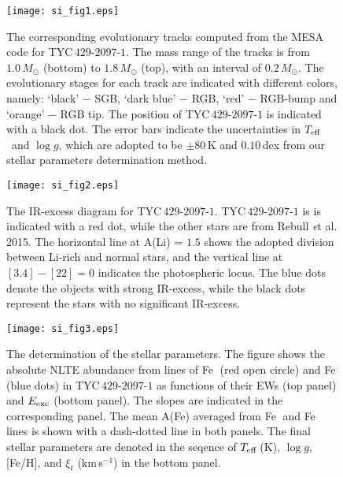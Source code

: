 \documentclass[twoside,onecolumnm,12pt]{article}
\newcommand{\upcite}[1]{\textsuperscript{\textsuperscript{\cite{#1}}}}
\newcommand{\Teff}{$T_{\rm eff}$}
\newcommand\ion[2]{#1$\;${\scriptsize\rmfamily\uppercase\expandafter{\romannumeral#2}}\relax}
\begin{document}
\begin{figure}[!h]
\setlength{\abovecaptionskip}{-15pt}
\setlength{\belowcaptionskip}{-15pt}
\texttt{[image: si\_fig1.eps]}\\
\caption{The corresponding evolutionary tracks computed from the MESA code for TYC\,$429$-$2097$-$1$. The mass range of the tracks is from $1.0\,M_{\odot}$ (bottom) to $1.8\,M_{\odot}$ (top), with an interval of $0.2\,M_{\odot}$. The evolutionary stages for each track are indicated with different colors, namely: `black' $-$ SGB, `dark blue' $-$ RGB, `red' $-$ RGB-bump and `orange' $-$ RGB tip. The position of TYC\,$429$-$2097$-$1$ is indicated with a black dot. The error bars indicate the uncertainties in \Teff\ and $\log g$, which are adopted to be $\pm 80$\,K and $0.10$\,dex from our stellar parameters determination method.}\label{s_fig1}
\end{figure}


\begin{figure}[!h]
\setlength{\abovecaptionskip}{-10pt}
\setlength{\belowcaptionskip}{-10pt}
\texttt{[image: si\_fig2.eps]}\\
\caption{The IR-excess diagram for TYC\,$429$-$2097$-$1$. TYC\,$429$-$2097$-$1$ is is indicated with a red dot, while the other stars are from Rebull {\emph et al.}\upcite{Rebull2015} 2015. The horizontal line at A(Li) = $1.5$ shows the adopted division between Li-rich and normal stars, and the vertical line at $[3.4]-[22]=0$ indicates the photospheric locus. The blue dots denote the objects with strong IR-excess, while the black dots represent the stars with no significant IR-excess.}\label{s_fig2}
\end{figure}


\begin{figure}[!h]
\setlength{\abovecaptionskip}{-10pt}
\setlength{\belowcaptionskip}{-10pt}
\texttt{[image: si\_fig3.eps]}\\
\caption{The determination of the stellar parameters. The figure shows the absolute NLTE abundance from lines of \ion{Fe}{1} (red open circle) and \ion{Fe}{2} (blue dots) in TYC\,$429$-$2097$-$1$ as functions of their EWs (top panel) and $E_{\rm exc}$ (bottom panel). The slopes are indicated in the corresponding panel. The mean A(Fe) averaged from \ion{Fe}{1} and \ion{Fe}{2} lines is shown with a dash-dotted line in both panels. The final stellar parameters are denoted in the seqence of \Teff\,(K), $\log g$, [Fe/H], and $\xi_t$ (km\,s$^{-1}$) in the bottom panel.}\label{s_fig3}
\end{figure}
\end{document}
